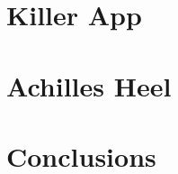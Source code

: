 \documentclass{acm_proc_article-sp}
\begin{document}
\section{Killer App}

\section{Achilles Heel}


\section{Conclusions}


%


\balancecolumns
\end{document}
